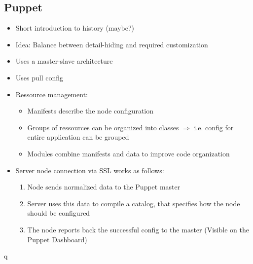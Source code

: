 \subsection{Puppet}

	\begin{itemize}
		\item Short introduction to history (maybe?)
		\item Idea: Balance between detail-hiding and required customization
	\end{itemize}

	\begin{itemize}
		\item Uses a master-slave architecture
		\item Uses pull config
		\item Ressource management:
		\begin{itemize}
			\item Manifests describe the node configuration
			\item Groups of ressources can be organized into classes $\Rightarrow$ i.e. config for entire application can be grouped
			\item Modules combine manifests and data to improve code organization
		\end{itemize}
		\item Server node connection via SSL works as follows:
		\begin{enumerate}
			\item Node sends normalized data to the Puppet master
			\item Server uses this data to compile a catalog, that specifies how the node should be configured
			\item The node reports back the successful config to the master (Visible on the Puppet Dashboard)
		\end{enumerate}
	\end{itemize}
q